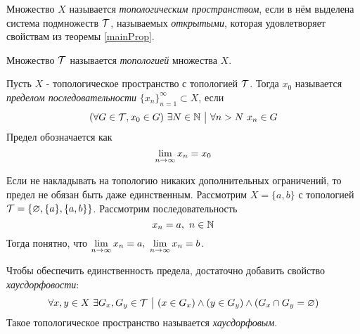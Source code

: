 \begin{definition}
	Множество $X$ называется \textit{топологическим пространством}, если в нём выделена система подмножеств $\mathcal{T}$, называемых \textit{открытыми}, которая удовлетворяет свойствам из теоремы \ref{mainProp}.
	
	Множество $\mathcal{T}$ называется \textit{топологией} множества $X$.
\end{definition}

\begin{definition}
	Пусть $X$ - топологическое пространство с топологией $\mathcal{T}$. Тогда $x_0$ называется \textit{пределом последовательности} $\{x_n\}_{n = 1}^\infty \subset X$, если
	\[
		(\forall G \in \Tau, x_0 \in G)\ \exists N \in \N \such \forall n > N\ x_n \in G
	\]
	Предел обозначается как
	\[
		\lim\limits_{n \to \infty} x_n = x_0
	\]
\end{definition}

\begin{example}
	Если не накладывать на топологию никаких дополнительных ограничений, то предел не обязан быть даже единственным. Рассмотрим $X = \{a, b\}$ с топологией $\mathcal{T} = \{\varnothing, \{a\}, \{a, b\}\}$. Рассмотрим последовательность
	\[
		x_n = a,\ n \in \mathbb{N}
	\]
	Тогда понятно, что $\lim\limits_{n \to \infty} x_n = a,\ \lim\limits_{n \to \infty} x_n = b$.
\end{example}

\begin{anote}
	Чтобы обеспечить единственность предела, достаточно добавить свойство \textit{хаусдорфовости}:
	\[
		\forall x, y \in X\ \exists G_x, G_y \in \mathcal{T} \ \big|\  (x \in G_x) \wedge (y \in G_y) \wedge (G_x \cap G_y = \varnothing)
	\]
	Такое топологическое пространство называется \textit{хаусдорфовым}.
\end{anote}